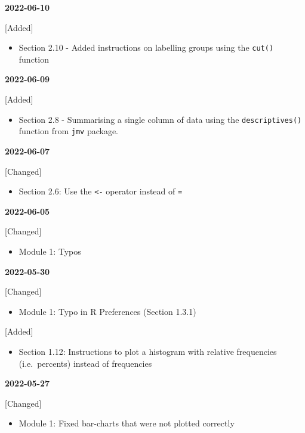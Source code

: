 \documentclass[
]{memoir}
\providecommand{\tightlist}{%
  \setlength{\itemsep}{0pt}\setlength{\parskip}{0pt}}
\begin{document}
\textbf{2022-06-10}

{[}Added{]}

\begin{itemize}
\tightlist
\item
  Section 2.10 - Added instructions on labelling groups using the \texttt{cut()} function
\end{itemize}

\textbf{2022-06-09}

{[}Added{]}

\begin{itemize}
\tightlist
\item
  Section 2.8 - Summarising a single column of data using the \texttt{descriptives()} function from \texttt{jmv} package.
\end{itemize}

\textbf{2022-06-07}

{[}Changed{]}

\begin{itemize}
\tightlist
\item
  Section 2.6: Use the \texttt{\textless{}-} operator instead of \texttt{=}
\end{itemize}

\textbf{2022-06-05}

{[}Changed{]}

\begin{itemize}
\tightlist
\item
  Module 1: Typos
\end{itemize}

\textbf{2022-05-30}

{[}Changed{]}

\begin{itemize}
\tightlist
\item
  Module 1: Typo in R Preferences (Section 1.3.1)
\end{itemize}

{[}Added{]}

\begin{itemize}
\tightlist
\item
  Section 1.12: Instructions to plot a histogram with relative frequencies (i.e.~percents) instead of frequencies
\end{itemize}

\textbf{2022-05-27}

{[}Changed{]}

\begin{itemize}
\tightlist
\item
  Module 1: Fixed bar-charts that were not plotted correctly
\end{itemize}
\end{document}
